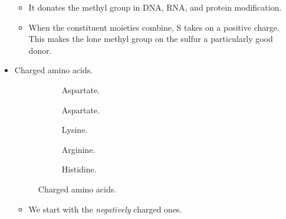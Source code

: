 \documentclass[../notes.tex]{subfiles}
\begin{document}
\begin{itemize}
\begin{figure}[h!]
        \label{fig:SAM}
    \end{figure}
    \begin{itemize}
        \item It donates the methyl group in DNA, RNA, and protein modification.
        \item When the constituent moieties combine, S takes on a positive charge. This makes the lone methyl group on the sulfur a particularly good donor.
    \end{itemize}
    \item Charged amino acids.
    \begin{figure}[h!]
        \centering
        \footnotesize
        \begin{subfigure}[b]{0.19\linewidth}
            \centering
            \caption{Aspartate.}
            \label{fig:AAchargedD}
        \end{subfigure}
        \begin{subfigure}[b]{0.19\linewidth}
            \centering
            \caption{Aspartate.}
            \label{fig:AAchargedE}
        \end{subfigure}
        \begin{subfigure}[b]{0.19\linewidth}
            \centering
            \caption{Lysine.}
            \label{fig:AAchargedK}
        \end{subfigure}
        \begin{subfigure}[b]{0.19\linewidth}
            \centering
            \caption{Arginine.}
            \label{fig:AAchargedR}
        \end{subfigure}
        \begin{subfigure}[b]{0.19\linewidth}
            \centering
            \caption{Histidine.}
            \label{fig:AAchargedH}
        \end{subfigure}
        \caption{Charged amino acids.}
        \label{fig:AAcharged}
    \end{figure}
    \begin{itemize}
        \item We start with the \emph{negatively} charged ones.

\end{itemize}
\end{itemize}
\end{document}
